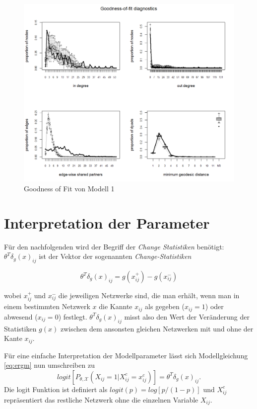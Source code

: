 \documentclass[a4paper,ngerman,oneside,titlepage,bibliography=totoc,11pt]{scrreprt}
\begin{document}
\begin{figure}[ht]
	\centering
		\includegraphics[width=1\textwidth]{../ERGM/GOF3.png}
	\caption{Goodness of Fit von Modell 1}
	\label{fig:gof.model1}
\end{figure}


\section{Interpretation der Parameter}

Für den nachfolgenden wird der Begriff der \emph{Change Statistiken} benötigt: $\theta^T\delta_g(x)_{ij}$ ist der Vektor der sogenannten \emph{Change-Statistiken}
 
$$ \theta^T\delta_g(x)_{ij} = g(x^+_{ij}) - g(x^-_{ij}) $$

wobei $x^+_{ij}$ und $x^-_{ij}$ die jeweiligen Netzwerke sind, die man erhält, wenn man in einem bestimmten Netzwerk $x$ die Kannte $x_{ij}$ als gegeben ($x_{ij} = 1$) oder abwesend ($x_{ij}= 0$) festlegt. $\theta^T\delta_g(x)_{ij}$ misst also den Wert der Veränderung der Statistiken $g(x)$ zwischen dem ansonsten gleichen Netzwerken mit und ohne der Kante $x_{ij}$.


Für eine einfache Interpretation der Modellparameter lässt sich Modellgleichung \ref{eq:ergm} nun umschreiben zu 
\begin{equation}
	logit\left[P_{\theta, \mathcal{X}}(X_{ij} = 1 | X^c_{ij} = x^c_{ij})\right] = \theta^T\delta_g(x)_{ij}.
	\label{eq:change}
\end{equation}
Die logit Funktion ist definiert als $logit(p) = log\left[p/(1-p)\right]$ und $X^c_{ij}$ repräsentiert das restliche Netzwerk ohne die einzelnen Variable $X_{ij}$. 
\end{document}
